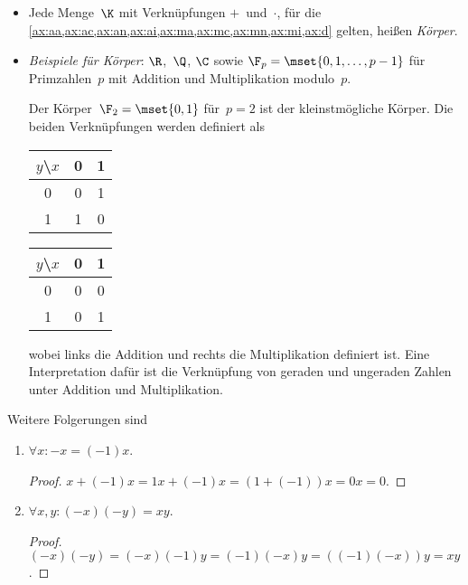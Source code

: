 \documentclass[a4paper]{article}
\begin{document}
\begin{remark}\leavevmode
    \begin{itemize}
        \item Jede Menge~$\K$ mit Verknüpfungen $+$~und~$\cdot$, für die \cref{ax:aa,ax:ac,ax:an,ax:ai,ax:ma,ax:mc,ax:mn,ax:mi,ax:d} gelten, heißen \emph{Körper}.
        \item \emph{Beispiele für Körper}: $\R$,~$\Q$, $\C$ sowie $\F_p = \mset{0, 1, \dots, p-1}$ für Primzahlen~$p$ mit Addition und Multiplikation modulo~$p$.

              Der Körper~$\F_2 = \mset{0, 1}$ für~$p = 2$ ist der kleinstmögliche Körper. Die beiden Verknüpfungen werden definiert als
              \begin{center}
                  \hspace*{\fill}
                  \begin{tabular}{c|cc}
                      $y$\textbackslash$x$ & 0 & 1 \\\hline
                      0                    & 0 & 1 \\
                      1                    & 1 & 0
                  \end{tabular}
                  \hfill
                  \begin{tabular}{c|cc}
                      $y$\textbackslash$x$ & 0 & 1 \\\hline
                      0                    & 0 & 0 \\
                      1                    & 0 & 1
                  \end{tabular}
                  \hspace*{\fill}
              \end{center}
              wobei links die Addition und rechts die Multiplikation definiert ist. Eine Interpretation dafür ist die Verknüpfung von geraden und ungeraden Zahlen unter Addition und Multiplikation.
    \end{itemize}
\end{remark}


Weitere Folgerungen sind
\begin{enumerate}[resume*=conclusions]
    \item $\forall x\colon -x = (-1) x$.
          \begin{proof}
              $x + (-1)x = 1x + (-1)x = (1 + (-1)) x = 0x = 0$.
          \end{proof}
    \item $\forall x, y\colon (-x) (-y) = x y$.
          \begin{proof}
              $(-x) (-y) = (-x) (-1) y = (-1) (-x) y = ((-1) (-x)) y = x y$.
          \end{proof}
\end{enumerate}
\end{document}

